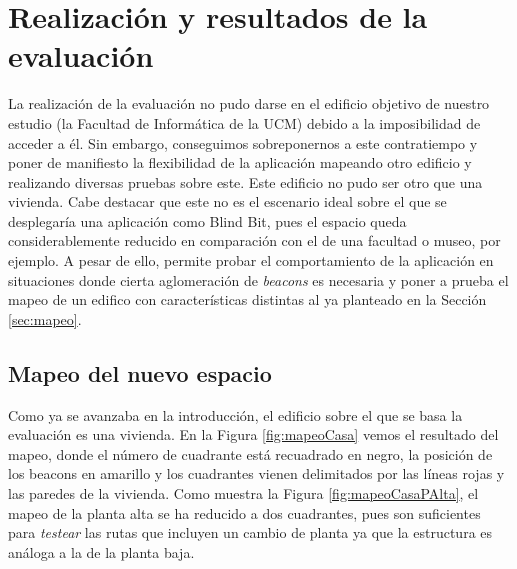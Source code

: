 \section{Realización y resultados de la evaluación}
\label{sec:realizYresult}

La realización de la evaluación no pudo darse en el edificio objetivo de nuestro estudio (la Facultad de Informática de la UCM) debido a la imposibilidad de acceder a él. Sin embargo, conseguimos sobreponernos a este contratiempo y poner de manifiesto la flexibilidad de la aplicación mapeando otro edificio y realizando diversas pruebas sobre este. Este edificio no pudo ser otro que una vivienda. Cabe destacar que este no es el escenario ideal sobre el que se desplegaría una aplicación como Blind Bit, pues el espacio queda considerablemente reducido en comparación con el de una facultad o museo, por ejemplo. A pesar de ello, permite probar el comportamiento de la aplicación en situaciones donde cierta aglomeración de \textit{beacons} es necesaria y poner a prueba el mapeo de un edifico con características distintas al ya planteado en la Sección \ref{sec:mapeo}.

\subsection{Mapeo del nuevo espacio}

Como ya se avanzaba en la introducción, el edificio sobre el que se basa la evaluación es una vivienda. En la Figura \ref{fig:mapeoCasa} vemos el resultado del mapeo, donde el número de cuadrante está recuadrado en negro, la posición de los beacons en amarillo y los cuadrantes vienen delimitados por las líneas rojas y las paredes de la vivienda. Como muestra la Figura \ref{fig:mapeoCasaPAlta}, el mapeo de la planta alta se ha reducido a dos cuadrantes, pues son suficientes para \textit{testear} las rutas que incluyen un cambio de planta ya que la estructura es análoga a la de la planta baja.


